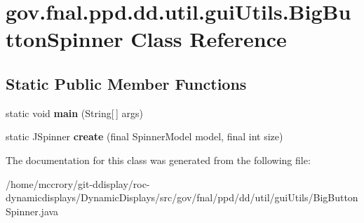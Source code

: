 \hypertarget{classgov_1_1fnal_1_1ppd_1_1dd_1_1util_1_1guiUtils_1_1BigButtonSpinner}{\section{gov.\-fnal.\-ppd.\-dd.\-util.\-gui\-Utils.\-Big\-Button\-Spinner Class Reference}
\label{classgov_1_1fnal_1_1ppd_1_1dd_1_1util_1_1guiUtils_1_1BigButtonSpinner}
}
\subsection*{Static Public Member Functions}
\begin{DoxyCompactItemize}
\item 
\hypertarget{classgov_1_1fnal_1_1ppd_1_1dd_1_1util_1_1guiUtils_1_1BigButtonSpinner_aeadaef752842508587c3591191772b4c}{static void {\bfseries main} (String\mbox{[}$\,$\mbox{]} args)}\label{classgov_1_1fnal_1_1ppd_1_1dd_1_1util_1_1guiUtils_1_1BigButtonSpinner_aeadaef752842508587c3591191772b4c}

\item 
\hypertarget{classgov_1_1fnal_1_1ppd_1_1dd_1_1util_1_1guiUtils_1_1BigButtonSpinner_a7445f7ddf331e4ccfd63df927fef8a34}{static J\-Spinner {\bfseries create} (final Spinner\-Model model, final int size)}\label{classgov_1_1fnal_1_1ppd_1_1dd_1_1util_1_1guiUtils_1_1BigButtonSpinner_a7445f7ddf331e4ccfd63df927fef8a34}

\end{DoxyCompactItemize}


The documentation for this class was generated from the following file\-:\begin{DoxyCompactItemize}
\item 
/home/mccrory/git-\/ddisplay/roc-\/dynamicdisplays/\-Dynamic\-Displays/src/gov/fnal/ppd/dd/util/gui\-Utils/Big\-Button\-Spinner.\-java\end{DoxyCompactItemize}
